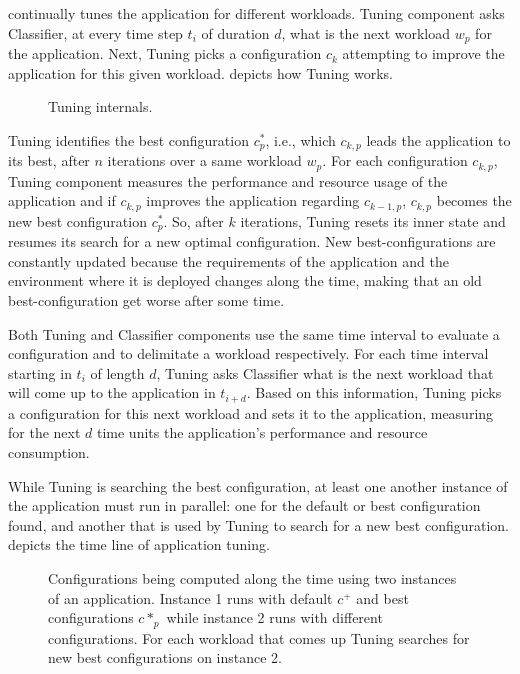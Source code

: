 \name continually tunes the application for different workloads. Tuning
component asks Classifier, at every time step $t_i$ of duration $d$, what is the
next workload $w_p$ for the application. Next, Tuning picks a configuration
$c_k$ attempting to improve the application for this given workload.
 depicts how Tuning works.

\begin{figure*}[htp]
  \centering
  \def\svcwidth{\textwidth}
  \scalebox{1.0}{}
  \caption{Tuning internals.}
  \label{fig:tuning-internals}
\end{figure*}

Tuning identifies the best configuration $c^*_p$, i.e., which $c_{k, p}$ leads
the application to its best, after $n$ iterations over a same workload $w_p$.
For each configuration $c_{k,p}$, Tuning component measures the performance and
resource usage of the application and if $c_{k,p}$ improves the application
regarding $c_{k-1, p}$, $c_{k,p}$ becomes the new best configuration $c^*_p$.
So, after $k$ iterations, Tuning resets its inner state and resumes its search
for a new optimal configuration. New best-configurations are constantly updated
because the requirements of the application and the environment where it is
deployed changes along the time, making that an old best-configuration get worse
after some time.

Both Tuning and Classifier components use the same time interval to evaluate a
configuration and to delimitate a workload respectively. For each time interval
starting in $t_i$ of length $d$, Tuning asks Classifier what is the next
workload that will come up to the application in $t_{i+d}$. Based on this
information, Tuning picks a configuration for this next workload and sets it to
the application, measuring for the next $d$ time units the application's
performance and resource consumption.

While Tuning is searching the best configuration, at least one another instance of
the application must run in parallel: one for the default or best configuration
found, and another that is used by Tuning to search for a new best
configuration.  depicts the time line of
application tuning.

\begin{figure*}[htp]
  \centering
  \def\svcwidth{\textwidth}
  \scalebox{1.0}{}
  \caption{Configurations being computed along the time using two instances of an
  application. Instance 1 runs with default $c^+$ and best configurations $c*_p$
  while instance 2 runs with different configurations. For each workload that
  comes up Tuning searches for new best configurations on instance 2.}
  \label{fig:computing-configurations}
\end{figure*}

